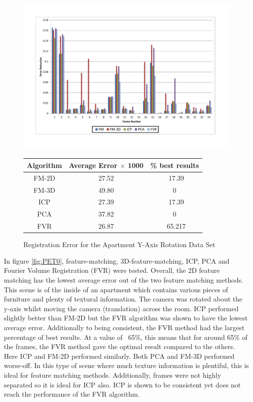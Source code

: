 \begin{figure}
\centering
\includegraphics[width=6in]{images/results/Apartment_Texture_Rotate}
\caption{Registration Error for the Apartment Y-Axis Rotation Data Set}
\label{fig:PET0}

\begin{tabular}{ccc}
\hline
\textbf{Algorithm} & \textbf{Average Error $\times$ 1000} & \textbf{\% best results}\\ \hline
FM-2D	& 27.52 & ~17.39\\
FM-3D	& 49.80 & 0\\
ICP		& 27.39 & ~17.39\\
PCA		& 37.82 & 0\\
FVR		& 26.87 & ~65.217\\
\end{tabular}
\label{tab:PET0ST}
\end{figure} 



In figure \ref{fig:PET0}, feature-matching, 3D-feature-matching, ICP, PCA and Fourier Volume Registration (FVR) were tested. Overall, the 2D feature matching has the lowest average error out of the two feature matching methods. This scene is of the inside of an apartment which contains various pieces of furniture and plenty of textural information. The camera was rotated about the y-axis whilst moving the camera (translation) across the room. ICP performed slightly better than FM-2D but the FVR algorithm was shown to have the lowest average error. Additionally to being consistent, the FVR method had the largest percentage of best results. At a value of ~65\%, this means that for around 65\% of the frames, the FVR method gave the optimal result compared to the others. Here ICP and FM-2D performed similarly. Both PCA and FM-3D performed worse-off. In this type of scene where much texture information is plentiful, this is ideal for feature matching methods. Additionally, frames were not highly separated so it is ideal for ICP also. ICP is shown to be consistent yet does not reach the performance of the FVR algorithm. \\


